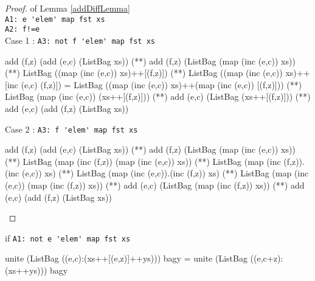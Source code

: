 \begin{proof} of Lemma \ref{addDiffLemma}\\
\verb|A1: e 'elem' map fst xs|\\
\verb|A2: f!=e|\\
Case 1 : \verb|A3: not f 'elem' map fst xs|
\begin{code}
add (f,z) (add (e,c) (ListBag xs)) 
             (**) add (f,z) (ListBag (map (inc (e,c)) xs))
             (**) ListBag ((map (inc (e,c)) xs)++[(f,z)])
             (**) ListBag ((map (inc (e,c)) xs)++[inc (e,c) (f,z)])
             = ListBag ((map (inc (e,c)) xs)++(map (inc (e,c)) [(f,z)]))
             (**) ListBag (map (inc (e,c)) (xs++[(f,z)]))
             (**) add (e,c) (ListBag (xs++[(f,z)]))
             (**) add (e,c) (add (f,z) (ListBag xs))
\end{code}
Case 2 : \verb|A3: f 'elem' map fst xs|
\begin{code}
add (f,z) (add (e,c) (ListBag xs)) 
             (**) add (f,z) (ListBag (map (inc (e,c)) xs))
             (**) ListBag (map (inc (f,z)) (map (inc (e,c)) xs))
             (**) ListBag (map (inc (f,z)).(inc (e,c)) xs)
             (**) ListBag (map (inc (e,c)).(inc (f,z)) xs)
             (**) ListBag (map (inc (e,c)) (map (inc (f,z)) xs))
             (**) add (e,c) (ListBag (map (inc (f,z)) xs))
             (**) add (e,c) (add (f,z) (ListBag xs))
\end{code}
\end{proof}
\begin{lemma}\label{incLemma}if  \verb|A1: not e 'elem' map fst xs|
\begin{code}
unite (ListBag ((e,c):(xs++[(e,z)]++ys))) bagy 
                 = unite (ListBag ((e,c+z):(xs++ys))) bagy
\end{code}
\end{lemma}
